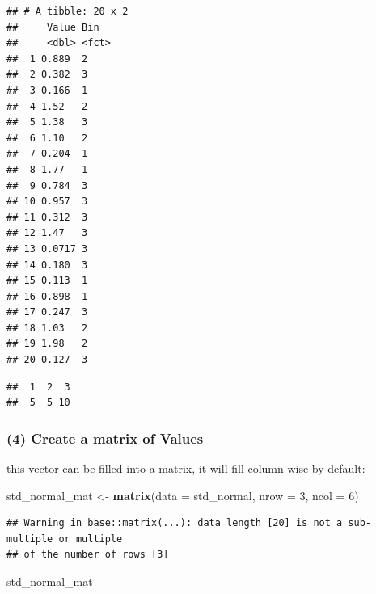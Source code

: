 \documentclass[]{article}
\newenvironment{Shaded}{}{}
\newcommand{\DataTypeTok}[1]{\textcolor[rgb]{0.56,0.13,0.00}{#1}}
\newcommand{\DecValTok}[1]{\textcolor[rgb]{0.25,0.63,0.44}{#1}}
\newcommand{\KeywordTok}[1]{\textcolor[rgb]{0.00,0.44,0.13}{\textbf{#1}}}
\newcommand{\NormalTok}[1]{#1}
\newcommand{\OperatorTok}[1]{\textcolor[rgb]{0.40,0.40,0.40}{#1}}
\newcommand{\StringTok}[1]{\textcolor[rgb]{0.25,0.44,0.63}{#1}}
\begin{document}
\begin{verbatim}
## # A tibble: 20 x 2
##     Value Bin  
##     <dbl> <fct>
##  1 0.889  2    
##  2 0.382  3    
##  3 0.166  1    
##  4 1.52   2    
##  5 1.38   3    
##  6 1.10   2    
##  7 0.204  1    
##  8 1.77   1    
##  9 0.784  3    
## 10 0.957  3    
## 11 0.312  3    
## 12 1.47   3    
## 13 0.0717 3    
## 14 0.180  3    
## 15 0.113  1    
## 16 0.898  1    
## 17 0.247  3    
## 18 1.03   2    
## 19 1.98   2    
## 20 0.127  3
\end{verbatim}

\begin{Shaded}
\end{Shaded}

\begin{verbatim}
##  1  2  3 
##  5  5 10
\end{verbatim}

\hypertarget{create-a-matrix-of-values}{%
\subsubsection{(4) Create a matrix of
Values}\label{create-a-matrix-of-values}}

this vector can be filled into a matrix, it will fill column wise by
default:

\begin{Shaded}
\begin{Highlighting}[]
\NormalTok{std_normal_mat <-}\StringTok{ }\KeywordTok{matrix}\NormalTok{(}\DataTypeTok{data =}\NormalTok{ std_normal, }\DataTypeTok{nrow =} \DecValTok{3}\NormalTok{, }\DataTypeTok{ncol =} \DecValTok{6}\NormalTok{)}
\end{Highlighting}
\end{Shaded}

\begin{verbatim}
## Warning in base::matrix(...): data length [20] is not a sub-multiple or multiple
## of the number of rows [3]
\end{verbatim}

\begin{Shaded}
\begin{Highlighting}[]
\NormalTok{std_normal_mat}
\end{Highlighting}
\end{Shaded}
\end{document}
